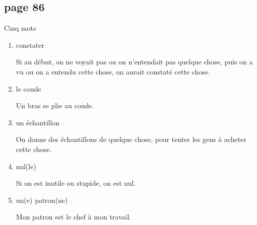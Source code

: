 \documentclass[letterpaper]{article}
\begin{document}
\doublespacing
\subsection*{page 86}
Cinq mots
\begin{enumerate}
\item constater

Si au début, on ne voyait pas ou on n'entendait pas quelque chose, puis on a vu ou on a entendu cette chose, on aurait constaté cette chose.

\item le coude

Un bras se plie au coude.

\item un échantillon

On donne des échantillons de quelque chose, pour tenter les gens à acheter cette chose.

\item nul(le)

Si on est inutile ou stupide, on est nul.

\item un(e) patron(ne)

Mon patron est le chef à mon travail.
\end{enumerate}
\end{document}
